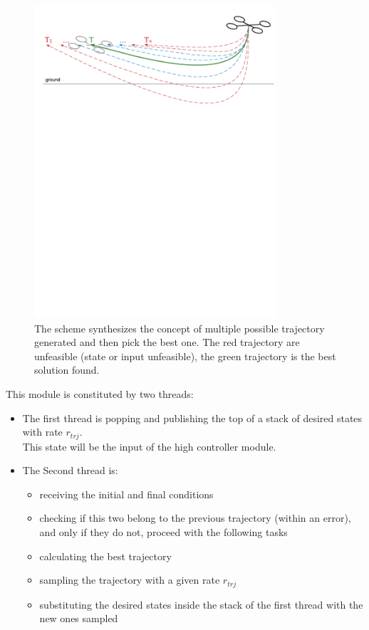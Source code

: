 \begin{figure}[!htbp]
    \centering
    \includegraphics[width=0.8\textwidth]{img/trajectory_generation.pdf}
    \caption{The scheme synthesizes the concept of multiple possible trajectory generated and then pick the best one. The red trajectory are unfeasible (state or input unfeasible), the green trajectory is the best solution found.}
    \label{fig:traject_gen}
\end{figure}

This module is constituted by two threads:
\begin{itemize}
\item The first thread is popping and publishing the top of a stack of desired states with rate $r_{trj}$. \\
This state will be the input of the high controller module.
\item The Second thread is:
\begin{itemize}
\item receiving the initial and final conditions
\item checking if this two belong to the previous trajectory (within an error), and only if they do not, proceed with the following tasks
\item calculating the best trajectory
\item sampling the trajectory with a given rate $r_{trj}$
\item substituting the desired states inside the stack of the first thread with the new ones sampled
\end{itemize}
\end{itemize}

